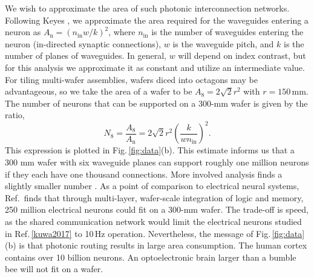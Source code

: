 \documentclass[twocolumn]{article}
\begin{document}
We wish to approximate the area of such photonic interconnection networks. Following Keyes \cite{ke1982}, we approximate the area required for the waveguides entering a neuron as $A_{\mathrm{n}} = (n_{\mathrm{in}} w/k)^2$, where $n_{\mathrm{in}}$ is the number of waveguides entering the neuron (in-directed synaptic connections), $w$ is the waveguide pitch, and $k$ is the number of planes of waveguides. In general, $w$ will depend on index contrast, but for this analysis we approximate it as constant and utilize an intermediate value. For tiling multi-wafer assemblies, wafers diced into octagons may be advantageous, so we take the area of a wafer to be $A_8 = 2\sqrt{2}r^2$ with $r = 150$\,mm. The number of neurons that can be supported on a 300-mm wafer is given by the ratio,
\begin{equation}
\label{eq:numNeuronPerWafer}
N_8 = \frac{A_8}{A_{\mathrm{n}}} = 2\sqrt{2}r^2\left(\frac{k}{wn_{\mathrm{in}}}\right)^2.
\end{equation}
This expression is plotted in Fig.\,\ref{fig:data}(b). This estimate informs us that a 300 mm wafer with six waveguide planes can support roughly one million neurons if they each have one thousand connections. More involved analysis finds a slightly smaller number \cite{sh2018e}. As a point of comparison to electrical neural systems, Ref.\,\cite{kuwa2017} finds that through multi-layer, wafer-scale integration of logic and memory, 250 million electrical neurons could fit on a 300-mm wafer. The trade-off is speed, as the shared communication network would limit the electrical neurons studied in Ref.\,\ref{kuwa2017} to 10\,Hz operation. Nevertheless, the message of Fig.\,\ref{fig:data}(b) is that photonic routing results in large area consumption. The human cortex contains over 10 billion neurons. An optoelectronic brain larger than a bumble bee will not fit on a wafer.
\end{document}
